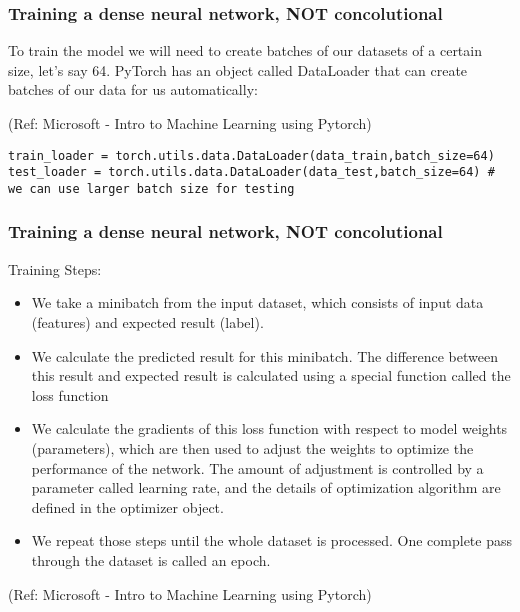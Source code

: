 \begin{frame}[fragile] \frametitle{Training a dense neural network, NOT concolutional}


To train the model we will need to create batches of our datasets of a certain size, let's say 64. PyTorch has an object called DataLoader that can create batches of our data for us automatically:

\tiny{(Ref: Microsoft - Intro to Machine Learning using Pytorch)}


\begin{lstlisting}
train_loader = torch.utils.data.DataLoader(data_train,batch_size=64)
test_loader = torch.utils.data.DataLoader(data_test,batch_size=64) # we can use larger batch size for testing
\end{lstlisting}



\end{frame}

\begin{frame}[fragile] \frametitle{Training a dense neural network, NOT concolutional}

Training Steps:

\begin{itemize}
\item We take a minibatch from the input dataset, which consists of input data (features) and expected result (label).
\item We calculate the predicted result for this minibatch.
The difference between this result and expected result is calculated using a special function called the loss function
\item We calculate the gradients of this loss function with respect to model weights (parameters), which are then used to adjust the weights to optimize the performance of the network. The amount of adjustment is controlled by a parameter called learning rate, and the details of optimization algorithm are defined in the optimizer object.
\item We repeat those steps until the whole dataset is processed. One complete pass through the dataset is called an epoch.
\end{itemize}


\tiny{(Ref: Microsoft - Intro to Machine Learning using Pytorch)}
\end{frame}


